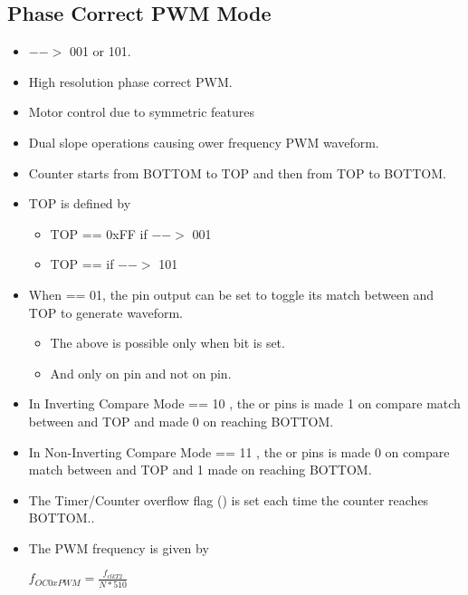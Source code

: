 \documentclass{article}
\begin{document}
\subsection{Phase Correct PWM Mode}
\begin{itemize}
    \item {} $-->$ 001 or 101.
    \item High resolution phase correct PWM.
    \item Motor control due to symmetric features
    \item Dual slope operations causing ower frequency PWM waveform.
    \item Counter starts from BOTTOM to TOP and then from TOP to BOTTOM.
    \item TOP is defined by
    \begin{itemize}
        \item TOP == 0xFF if  $-->$ 001
        \item TOP ==  if  $-->$ 101
    \end{itemize}
    \item  When  == 01, the  pin output can be set to toggle its match between  and TOP to generate waveform.
    \begin{itemize}
        \item The above is possible only when  bit is set.
        \item And only on  pin and not on  pin.
    \end{itemize}
    \item In Inverting Compare Mode  == 10 , the  or  pins is made 1 on compare match between  and TOP and made 0 on reaching BOTTOM.
    \item In Non-Inverting Compare Mode  == 11 , the  or  pins is made 0 on compare match between  and TOP and 1 made  on reaching BOTTOM.
    \item The Timer/Counter overflow flag () is set each time the counter reaches BOTTOM..
    \item The PWM frequency is given by 
    \begin{center}
        { \Large $f_{OC0xPWM} = \frac{f_{clkT2}}{N * 510}$ }
    \end{center}
\end{itemize}
\end{document}
